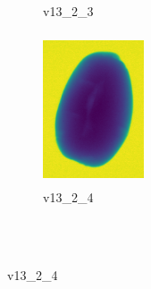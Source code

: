 \documentclass[11pt]{article}
\begin{document}
\begin{figure}
\begin{subfigure}[b]{0.15\textwidth}
        \caption{v13\_2\_3}
         \label{fig:five over x}
     \end{subfigure}
     \hfill
    \begin{subfigure}[b]{0.15\textwidth}
         \centering
         \includegraphics[width=3cm, height=4.5cm]{images/kartofler/v13_2_4_cut.png}
        \caption{v13\_2\_4}
         \label{fig:five over x}
     \end{subfigure}
     
     
        \\ \\
        

\end{figure}
\end{document}

